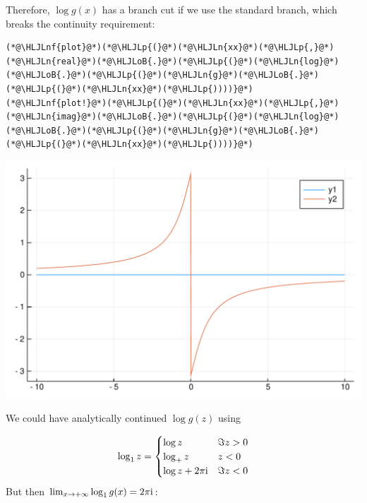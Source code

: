 \documentclass[12pt,a4paper]{article}
\newcommand{\HLJLn}[1]{#1}
\newcommand{\HLJLnf}[1]{\textcolor[RGB]{66,102,213}{#1}}
\newcommand{\HLJLoB}[1]{\textcolor[RGB]{102,102,102}{\textbf{#1}}}
\newcommand{\HLJLp}[1]{#1}
\def\I{ {\rm i} }
\begin{document}
Therefore, $\log g(x)$ has a branch cut if we use the standard branch, which breaks the continuity requirement:


\begin{lstlisting}
(*@\HLJLnf{plot}@*)(*@\HLJLp{(}@*)(*@\HLJLn{xx}@*)(*@\HLJLp{,}@*) (*@\HLJLn{real}@*)(*@\HLJLoB{.}@*)(*@\HLJLp{(}@*)(*@\HLJLn{log}@*)(*@\HLJLoB{.}@*)(*@\HLJLp{(}@*)(*@\HLJLn{g}@*)(*@\HLJLoB{.}@*)(*@\HLJLp{(}@*)(*@\HLJLn{xx}@*)(*@\HLJLp{))))}@*)
(*@\HLJLnf{plot!}@*)(*@\HLJLp{(}@*)(*@\HLJLn{xx}@*)(*@\HLJLp{,}@*) (*@\HLJLn{imag}@*)(*@\HLJLoB{.}@*)(*@\HLJLp{(}@*)(*@\HLJLn{log}@*)(*@\HLJLoB{.}@*)(*@\HLJLp{(}@*)(*@\HLJLn{g}@*)(*@\HLJLoB{.}@*)(*@\HLJLp{(}@*)(*@\HLJLn{xx}@*)(*@\HLJLp{))))}@*)
\end{lstlisting}

\includegraphics[width=\linewidth]{figures/Lecture25_2_1.pdf}

We could have analytically continued $\log g(z)$ using

\[
\log_1 z = \begin{cases} \log z & \Im z > 0 \\
                            \log_+ z & z < 0 \\
                            \log z + 2\pi \I & \Im z < 0 
                            \end{cases}
\]
But then $\lim_{x\rightarrow + \infty} \log_1 g(x) = 2 \pi \I$:
\end{document}

